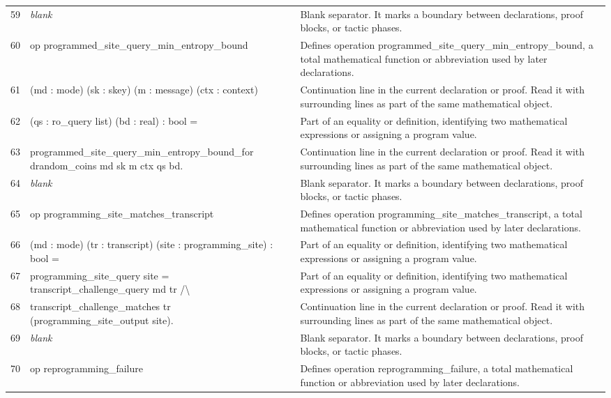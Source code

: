 \documentclass[10pt]{article}
\begin{document}
\begin{longtable}{r L{0.53\textwidth} L{0.37\textwidth}}
59 & {\ttfamily\scriptsize \emph{blank}} & Blank separator.  It marks a boundary between declarations, proof blocks, or tactic phases. \\
60 & {\ttfamily\scriptsize op programmed\_site\_query\_min\_entropy\_bound} & Defines operation programmed\_site\_query\_min\_entropy\_bound, a total mathematical function or abbreviation used by later declarations. \\
61 & {\ttfamily\scriptsize    (md : mode) (sk : skey) (m : message) (ctx : context)} & Continuation line in the current declaration or proof.  Read it with surrounding lines as part of the same mathematical object. \\
62 & {\ttfamily\scriptsize    (qs : ro\_query list) (bd : real) : bool =} & Part of an equality or definition, identifying two mathematical expressions or assigning a program value. \\
63 & {\ttfamily\scriptsize   programmed\_site\_query\_min\_entropy\_bound\_for drandom\_coins md sk m ctx qs bd.} & Continuation line in the current declaration or proof.  Read it with surrounding lines as part of the same mathematical object. \\
64 & {\ttfamily\scriptsize \emph{blank}} & Blank separator.  It marks a boundary between declarations, proof blocks, or tactic phases. \\
65 & {\ttfamily\scriptsize op programming\_site\_matches\_transcript} & Defines operation programming\_site\_matches\_transcript, a total mathematical function or abbreviation used by later declarations. \\
66 & {\ttfamily\scriptsize    (md : mode) (tr : transcript) (site : programming\_site) : bool =} & Part of an equality or definition, identifying two mathematical expressions or assigning a program value. \\
67 & {\ttfamily\scriptsize   programming\_site\_query site = transcript\_challenge\_query md tr /\textbackslash{}} & Part of an equality or definition, identifying two mathematical expressions or assigning a program value. \\
68 & {\ttfamily\scriptsize   transcript\_challenge\_matches tr (programming\_site\_output site).} & Continuation line in the current declaration or proof.  Read it with surrounding lines as part of the same mathematical object. \\
69 & {\ttfamily\scriptsize \emph{blank}} & Blank separator.  It marks a boundary between declarations, proof blocks, or tactic phases. \\
70 & {\ttfamily\scriptsize op reprogramming\_failure} & Defines operation reprogramming\_failure, a total mathematical function or abbreviation used by later declarations. \\

\end{longtable}
\end{document}
